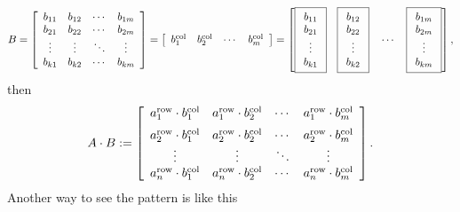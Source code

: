 \documentclass[letterpaper]{book}
\begin{document}
\begin{equation}
   B= \left[\begin{array}{cccc} b_{11}& b_{12}& \cdots & b_{1m} \\
 b_{21}& b_{22}& \cdots & b_{2m}  \\
 \vdots & \vdots&  \ddots & \vdots \\
 b_{k1}& b_{k2}& \cdots & b_{km} 
 \end{array}\right] =
\left[\begin{array}{cccc} b_1^{\rm col} & b_2^{\rm col} & \cdots & b_m^{\rm col}\end{array}\right]  = \left[ \boxed{\begin{array}{c} b_{11} \\ b_{21}\\ \vdots \\ b_{k1}\end{array} }~~~
\boxed{\begin{array}{c} b_{12} \\ b_{22}\\ \vdots \\ b_{k2}\end{array} }~~~\cdots~~~
\boxed{\begin{array}{c} b_{1m} \\ b_{2m}\\ \vdots \\ b_{km}\end{array} }\right],
\end{equation}
then
\begin{equation}
   A \cdot B:= 
\left[\begin{array}{cccc}  a_1^{\rm row} \cdot b_1^{\rm col} & a_1^{\rm row} \cdot b_2^{\rm col} & \cdots & a_1^{\rm row} \cdot b_m^{\rm col} \medskip  \\
a_2^{\rm row} \cdot b_1^{\rm col} & a_2^{\rm row} \cdot b_2^{\rm col} & \cdots & a_2^{\rm row} \cdot b_m^{\rm col} \\
\vdots & \vdots & \ddots & \vdots \\
a_n^{\rm row} \cdot b_1^{\rm col} & a_n^{\rm row} \cdot b_2^{\rm col} & \cdots & a_n^{\rm row} \cdot b_m^{\rm col}
\end{array}\right].
\end{equation}
Another way to see the pattern is like this
\end{document}
